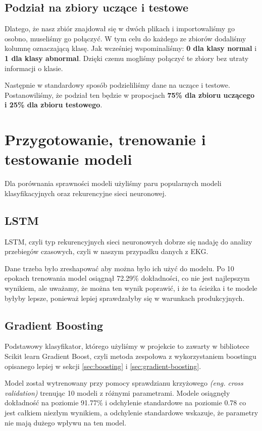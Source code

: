 \documentclass[12pt,a4paper]{article}
\begin{document}
\subsection{Podział na zbiory uczące i testowe}
Dlatego, że nasz zbiór znajdował się w dwóch plikach i importowaliśmy go osobno, museliśmy go połączyć. W tym celu do każdego ze zbiorów dodaliśmy kolumnę oznaczającą klasę. Jak wcześniej wspominaliśmy: \textbf{0 dla klasy normal} i \textbf{1 dla klasy abnormal}. Dzięki czemu mogliśmy połączyć te zbiory bez utraty informacji o klasie.

Następnie w standardowy sposób podzieliliśmy dane na uczące i testowe. Postanowiliśmy, że podział ten będzie w propocjach \textbf{75\% dla zbioru uczącego i 25\% dla zbioru testowego}.

\section{Przygotowanie, trenowanie i testowanie modeli}
Dla porównania sprawności modeli użyliśmy paru popularnych modeli klasyfikacyjnych oraz rekurencyjne sieci neuronowej.

\subsection{LSTM}
LSTM, czyli typ rekurencyjnych sieci neuronowych dobrze się nadaję do analizy przebiegów czasowych, czyli w naszym przypadku danych z EKG.

Dane trzeba było zreshapować aby można było ich użyć do modelu. Po 10 epokach trenowania model osiągnął 72.29\% dokładności, co nie jest najlepszym wynikiem, ale uważamy, że można ten wynik poprawić, i że ta ścieżka i te modele byłyby lepsze, ponieważ lepiej sprawdzałyby się w warunkach produkcyjnych.

\subsection{Gradient Boosting}
Podstawowy klasyfikator, którego użyliśmy w projekcie to zawarty w bibliotece Scikit learn Gradient Boost, czyli metoda zespołowa z wykorzystaniem boostingu opisanego lepiej w sekcji \ref{sec:boosting} i \ref{sec:gradient-boosting}.

Model został wytrenowany przy pomocy sprawdzianu krzyżowego \textit{(eng. cross validation)} trenując 10 modeli z różnymi parametrami. Modele osiągnęły dokładność na poziomie 91.77\% i odchylenie standardowe na poziomie 0.78 co jest całkiem niezłym wynikiem, a odchylenie standardowe wskazuje, że parametry nie mają dużego wpływu na ten model. 
\end{document}
